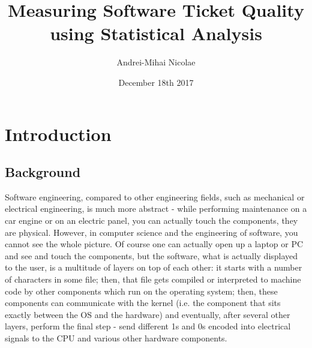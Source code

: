 \documentclass{mprop}
\begin{document}
\title{Measuring Software Ticket Quality using Statistical Analysis}
\author{Andrei-Mihai Nicolae}
\date{December 18th 2017}
\maketitle

\tableofcontents
\newpage


\section{Introduction}\label{intro}

\subsection{Background}

Software engineering, compared to other engineering fields, such as
mechanical or electrical engineering, is much more abstract \citep{brooks1995mythical}- while 
performing maintenance on a car engine or on an electric panel,
you can actually touch the components, they are physical. However, in
computer science and the engineering of software, you cannot see the whole picture.
Of course one can actually open up a laptop or PC and see and touch the
components, but the software, what is actually displayed to the user, 
is a multitude of layers on top of each other: it starts with a number of characters in some file;
then, that file gets compiled or interpreted to machine
code by other components which run on the operating system; then, these components
can communicate with the kernel (i.e. the component that sits exactly
between the OS and the hardware) and eventually, after several other layers, 
perform the final step - send different 1s and 0s encoded into electrical signals 
to the CPU and various other hardware components.
\end{document}
